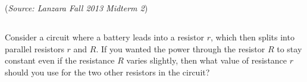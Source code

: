 \documentclass{article}
\begin{document}
(\textit{Source: Lanzara Fall 2013 Midterm 2})

\subsection{}

Consider a circuit where a battery leads into a resistor $r$, which then splits into parallel resistors $r$ and $R$. If you wanted the power through the resistor $R$ to stay constant even if the resistance $R$ varies slightly, then what value of resistance $r$ should you use for the two other resistors in the circuit?
\end{document}
